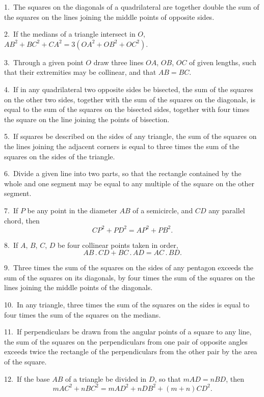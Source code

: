 \documentclass[oneside]{book}
\begin{document}
\begin{footnotesize}
1.~The squares on the diagonals of a quadrilateral are together
double the sum of the squares on the lines joining the middle
points of opposite sides.

2.~If the medians of a triangle intersect in $O$, $AB^{2} + BC^{2} + CA^{2}
=3(OA^{2} + OB^{2} + OC^{2})$.

3.~Through a given point $O$ draw three lines $OA$, $OB$, $OC$ of
given lengths, such that their extremities may be collinear, and
that $AB = BC$.

4.~If in any quadrilateral two opposite sides be bisected, the
sum of the squares on the other two sides, together with the sum
of the squares on the diagonals, is equal to the sum of the squares
on the bisected sides, together with four times the square on the
line joining the points of bisection.

5.~If squares be described on the sides of any triangle, the
sum of the squares on the lines joining the adjacent corners is
equal to three times the sum of the squares on the sides of the
triangle.


6.~Divide a given line into two parts, so that the rectangle
contained by the whole and one segment may be equal to any
multiple of the square on the other segment.

7.~If $P$ be any point in the diameter $AB$ of a semicircle, and
$CD$ any parallel chord, then
\[
CP^2 + PD^2 = AP^2 + PB^2.
\]

8.~If $A$, $B$, $C$, $D$ be four collinear points taken in order,
\[
AB\,.\,CD + BC\,.\,AD = AC\,.\,BD.
\]

9.~Three times the sum of the squares on the sides of any
pentagon exceeds the sum of the squares on its diagonals, by four
times the sum of the squares on the lines joining the middle
points of the diagonals.

10.~In any triangle, three times the sum of the squares on the
sides is equal to four times the sum of the squares on the medians.

11.~If perpendiculars be drawn from the angular points of a
square to any line, the sum of the squares on the perpendiculars
from one pair of opposite angles exceeds twice the rectangle
of the perpendiculars from the other pair by the area of the
square.

12.~If the base $AB$ of a triangle be divided in $D$, so that $mAD
= nBD$, then
\[
mAC^2 + nBC^2 = mAD^2 + nDB^2 + (m + n) CD^2.
\]


\end{footnotesize}
\end{document}
